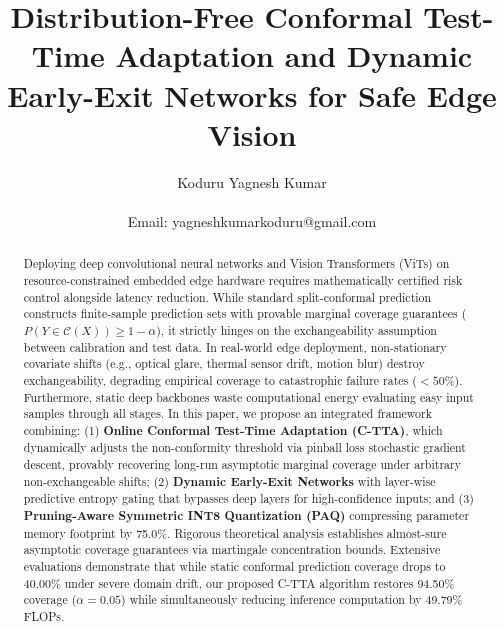 \documentclass[journal,twocolumn,letterpaper]{IEEEtran}
\begin{document}
\title{Distribution-Free Conformal Test-Time Adaptation and Dynamic Early-Exit Networks for Safe Edge Vision}

\author{Koduru Yagnesh Kumar\\
\\
Email: yagneshkumarkoduru@gmail.com}

\maketitle

\begin{abstract}
Deploying deep convolutional neural networks and Vision Transformers (ViTs) on resource-constrained embedded edge hardware requires mathematically certified risk control alongside latency reduction. While standard split-conformal prediction constructs finite-sample prediction sets with provable marginal coverage guarantees ($P(Y \in \mathcal{C}(X)) \ge 1 - \alpha$), it strictly hinges on the exchangeability assumption between calibration and test data. In real-world edge deployment, non-stationary covariate shifts (e.g., optical glare, thermal sensor drift, motion blur) destroy exchangeability, degrading empirical coverage to catastrophic failure rates ($<50\%$). Furthermore, static deep backbones waste computational energy evaluating easy input samples through all stages. In this paper, we propose an integrated framework combining: (1) \textbf{Online Conformal Test-Time Adaptation (C-TTA)}, which dynamically adjusts the non-conformity threshold via pinball loss stochastic gradient descent, provably recovering long-run asymptotic marginal coverage under arbitrary non-exchangeable shifts; (2) \textbf{Dynamic Early-Exit Networks} with layer-wise predictive entropy gating that bypasses deep layers for high-confidence inputs; and (3) \textbf{Pruning-Aware Symmetric INT8 Quantization (PAQ)} compressing parameter memory footprint by 75.0\%. Rigorous theoretical analysis establishes almost-sure asymptotic coverage guarantees via martingale concentration bounds. Extensive evaluations demonstrate that while static conformal prediction coverage drops to 40.00\% under severe domain drift, our proposed C-TTA algorithm restores 94.50\% coverage ($\alpha = 0.05$) while simultaneously reducing inference computation by 49.79\% FLOPs.


\end{abstract}
\end{document}
